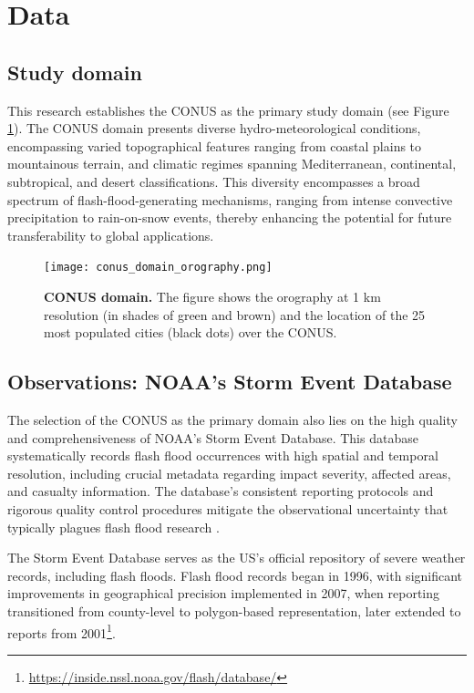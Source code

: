 \section{Data}
\label{flash_flood_focused_verification_rainfall_based_ff_DATA}


\subsection{Study domain}

This research establishes the CONUS as the primary study domain (see Figure \ref{fig:conus_domain}). The CONUS domain presents diverse hydro-meteorological conditions, encompassing varied topographical features ranging from coastal plains to mountainous terrain, and climatic regimes spanning Mediterranean, continental, subtropical, and desert classifications. This diversity encompasses a broad spectrum of flash-flood-generating mechanisms, ranging from intense convective precipitation to rain-on-snow events, thereby enhancing the potential for future transferability to global applications.

\begin{figure}[htbp]
\centering
\texttt{[image: conus\_domain\_orography.png]}
\caption{\textbf{CONUS domain.} The figure shows the orography at 1 km resolution (in shades of green and brown) and the location of the 25 most populated cities (black dots) over the CONUS.}
\label{fig:conus_domain}
\end{figure}

\subsection{Observations: NOAA's Storm Event Database}
\label{flash_flood_focused_verification_rainfall_based_ff_DATA_SED}

The selection of the CONUS as the primary domain also lies on the high quality and comprehensiveness of NOAA's Storm Event Database. This database systematically records flash flood occurrences with high spatial and temporal resolution, including crucial metadata regarding impact severity, affected areas, and casualty information. The database's consistent reporting protocols and rigorous quality control procedures mitigate the observational uncertainty that typically plagues flash flood research \citep{Panwar_2020}.

The Storm Event Database serves as the US's official repository of severe weather records, including flash floods. Flash flood records began in 1996, with significant improvements in geographical precision implemented in 2007, when reporting transitioned from county-level to polygon-based representation, later extended to reports from 2001\footnote{\url{https://inside.nssl.noaa.gov/flash/database/}}.

